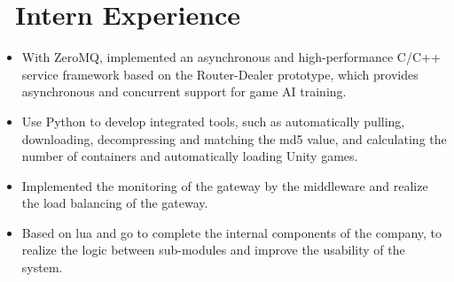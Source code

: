 \documentclass{resume}
\begin{document}
\section{\faSitemap\ Intern Experience}

\begin{itemize}
  \item With ZeroMQ, implemented an asynchronous and high-performance C/C++ service framework based on the Router-Dealer prototype, which provides asynchronous and concurrent support for game AI training.
  \item Use Python to develop integrated tools, such as automatically pulling, downloading, decompressing and matching the md5 value, and calculating the number of containers and automatically loading Unity games.
\end{itemize}

\begin{itemize}
  \item Implemented the monitoring of the gateway by the middleware and realize the load balancing of the gateway.
  \item Based on lua and go to complete the internal components of the company, to realize the logic between sub-modules and improve the usability of the system.
\end{itemize}

\end{document}
